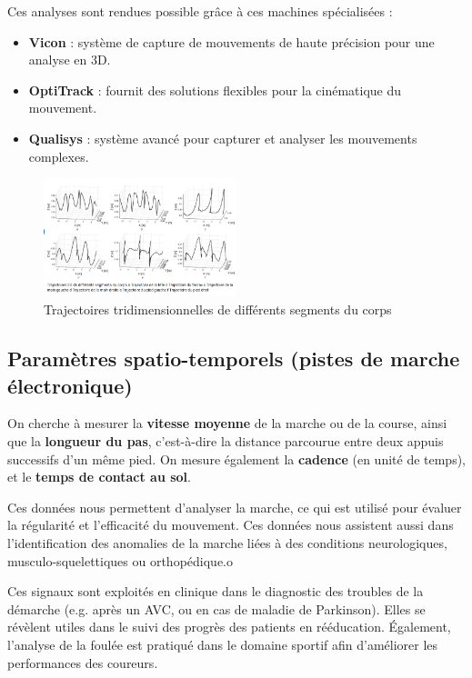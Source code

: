 Ces analyses sont rendues possible grâce à ces machines spécialisées : 
\begin{itemize}
  \item \textbf{Vicon} : système de capture de mouvements de haute précision pour une analyse en 3D.
  \item \textbf{OptiTrack} : fournit des solutions flexibles pour la cinématique du mouvement.
  \item \textbf{Qualisys} : système avancé pour capturer et analyser les mouvements complexes.
\end{itemize}

\begin{figure}[ht]
  \begin{center}
    \includegraphics[width=0.5\textwidth]{images/trajectoires_3D.png}
  \end{center}
  \caption{Trajectoires tridimensionnelles de différents segments du corps}\label{fig:trajectoires_tridimensionnelles}
\end{figure}

\subsection{Paramètres spatio-temporels (pistes de marche électronique)}

On cherche à mesurer la \textbf{vitesse moyenne} de la marche ou de la course, ainsi que la \textbf{longueur du pas}, c'est-à-dire la distance parcourue entre deux appuis successifs d'un même pied.
On mesure également la \textbf{cadence} (en unité de temps), et le \textbf{temps de contact au sol}.

Ces données nous permettent d'analyser la marche, ce qui est utilisé pour évaluer la régularité et l'efficacité du mouvement.
Ces données nous assistent aussi dans l'identification des anomalies de la marche liées à des conditions neurologiques, musculo-squelettiques ou orthopédique.o

Ces signaux sont exploités en clinique dans le diagnostic des troubles de la démarche (e.g. après un AVC, ou en cas de maladie de Parkinson).
Elles se révèlent utiles dans le suivi des progrès des patients en rééducation.
Également, l'analyse de la foulée est pratiqué dans le domaine sportif afin d'améliorer les performances des coureurs.

